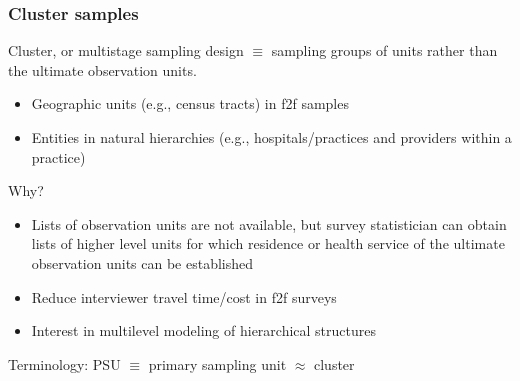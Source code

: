 \documentclass[handout]{beamer}
\begin{document}
\begin{frame}\frametitle{Cluster samples}

Cluster, or multistage sampling design $\equiv$ sampling groups of units rather than the ultimate observation units.
\begin{itemize}
    \item Geographic units (e.g., census tracts) in f2f samples
    \item Entities in natural hierarchies (e.g., hospitals/practices and providers within a practice)
\end{itemize}

Why?

\begin{itemize}
    \item Lists of observation units are not available, but survey statistician
        can obtain lists of higher level units
        for which residence or health service of the ultimate observation units
        can be established
    \item Reduce interviewer travel time/cost in f2f surveys
    \item Interest in multilevel modeling of hierarchical structures
\end{itemize}

Terminology: PSU $\equiv$ primary sampling unit $\approx$ cluster

\end{frame}
\end{document}
